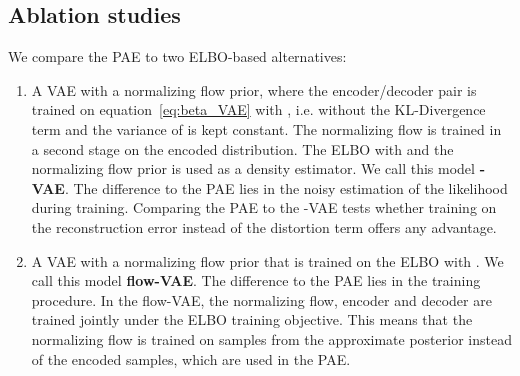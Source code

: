\documentclass[10pt]{article} \usepackage[accepted]{tmlr}
\begin{document}
\subsection{Ablation studies}
\label{sec:overview}
We compare the PAE to two ELBO-based alternatives:
\begin{enumerate}
\item A VAE with a normalizing flow prior, where the encoder/decoder pair is trained on equation~\ref{eq:beta_VAE} with , i.e. without the KL-Divergence term and the variance of  is kept constant. The normalizing flow is trained in a second stage on the encoded distribution. The ELBO with  and the normalizing flow prior is used as a density estimator. We call this model \textbf{-VAE}. The difference to the PAE lies in the noisy estimation of the likelihood during training. Comparing the PAE to the -VAE tests whether training on the reconstruction error instead of the distortion term offers any advantage.

\item A VAE with a  normalizing flow prior that is trained on the ELBO with . We call this model \textbf{flow-VAE}. The difference to the PAE lies in the training procedure. In the flow-VAE, the normalizing flow, encoder and decoder are trained jointly under the ELBO training objective. This means that the normalizing flow is trained on samples from the approximate posterior instead of the encoded samples, which are used in the PAE. 
\end{enumerate}
\end{document}
